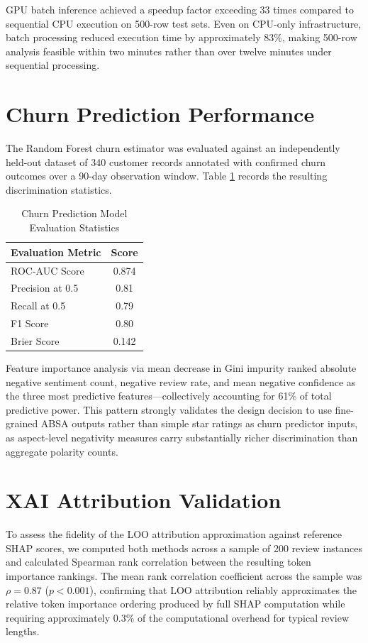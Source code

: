 \documentclass[12pt,a4paper]{report}
\begin{document}
GPU batch inference achieved a speedup factor exceeding 33 times compared to sequential CPU execution on 500-row test sets. Even on CPU-only infrastructure, batch processing reduced execution time by approximately 83\%, making 500-row analysis feasible within two minutes rather than over twelve minutes under sequential processing.

\section{Churn Prediction Performance}
The Random Forest churn estimator was evaluated against an independently held-out dataset of 340 customer records annotated with confirmed churn outcomes over a 90-day observation window. Table \ref{tab:churn} records the resulting discrimination statistics.

\begin{table}[H]
\centering
\caption{Churn Prediction Model Evaluation Statistics}
\label{tab:churn}
\begin{tabular}{@{}lc@{}}
\toprule
\textbf{Evaluation Metric} & \textbf{Score} \\
\midrule
ROC-AUC Score     & 0.874 \\
Precision at 0.5  & 0.81  \\
Recall at 0.5     & 0.79  \\
F1 Score          & 0.80  \\
Brier Score       & 0.142 \\
\bottomrule
\end{tabular}
\end{table}

Feature importance analysis via mean decrease in Gini impurity ranked absolute negative sentiment count, negative review rate, and mean negative confidence as the three most predictive features—collectively accounting for 61\% of total predictive power. This pattern strongly validates the design decision to use fine-grained ABSA outputs rather than simple star ratings as churn predictor inputs, as aspect-level negativity measures carry substantially richer discrimination than aggregate polarity counts.

\section{XAI Attribution Validation}
To assess the fidelity of the LOO attribution approximation against reference SHAP scores, we computed both methods across a sample of 200 review instances and calculated Spearman rank correlation between the resulting token importance rankings. The mean rank correlation coefficient across the sample was $\rho = 0.87$ ($p < 0.001$), confirming that LOO attribution reliably approximates the relative token importance ordering produced by full SHAP computation while requiring approximately 0.3\% of the computational overhead for typical review lengths.
\end{document}
